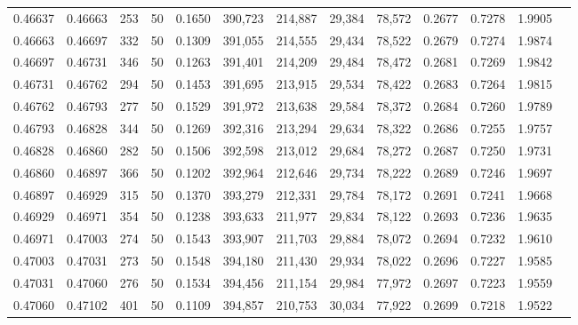 \begin{tabular}{rrrrrrrrrrrrr}
0.46637 & 0.46663 &   253 &  50 &                                     0.1650 & 390,723 & 214,887 &  29,384 &  78,572 & 0.2677 & 0.7278 & 1.9905 \\
0.46663 & 0.46697 &   332 &  50 &                                     0.1309 & 391,055 & 214,555 &  29,434 &  78,522 & 0.2679 & 0.7274 & 1.9874 \\
0.46697 & 0.46731 &   346 &  50 &                                     0.1263 & 391,401 & 214,209 &  29,484 &  78,472 & 0.2681 & 0.7269 & 1.9842 \\
0.46731 & 0.46762 &   294 &  50 &                                     0.1453 & 391,695 & 213,915 &  29,534 &  78,422 & 0.2683 & 0.7264 & 1.9815 \\
0.46762 & 0.46793 &   277 &  50 &                                     0.1529 & 391,972 & 213,638 &  29,584 &  78,372 & 0.2684 & 0.7260 & 1.9789 \\
0.46793 & 0.46828 &   344 &  50 &                                     0.1269 & 392,316 & 213,294 &  29,634 &  78,322 & 0.2686 & 0.7255 & 1.9757 \\
0.46828 & 0.46860 &   282 &  50 &                                     0.1506 & 392,598 & 213,012 &  29,684 &  78,272 & 0.2687 & 0.7250 & 1.9731 \\
0.46860 & 0.46897 &   366 &  50 &                                     0.1202 & 392,964 & 212,646 &  29,734 &  78,222 & 0.2689 & 0.7246 & 1.9697 \\
0.46897 & 0.46929 &   315 &  50 &                                     0.1370 & 393,279 & 212,331 &  29,784 &  78,172 & 0.2691 & 0.7241 & 1.9668 \\
0.46929 & 0.46971 &   354 &  50 &                                     0.1238 & 393,633 & 211,977 &  29,834 &  78,122 & 0.2693 & 0.7236 & 1.9635 \\
0.46971 & 0.47003 &   274 &  50 &                                     0.1543 & 393,907 & 211,703 &  29,884 &  78,072 & 0.2694 & 0.7232 & 1.9610 \\
0.47003 & 0.47031 &   273 &  50 &                                     0.1548 & 394,180 & 211,430 &  29,934 &  78,022 & 0.2696 & 0.7227 & 1.9585 \\
0.47031 & 0.47060 &   276 &  50 &                                     0.1534 & 394,456 & 211,154 &  29,984 &  77,972 & 0.2697 & 0.7223 & 1.9559 \\
0.47060 & 0.47102 &   401 &  50 &                                     0.1109 & 394,857 & 210,753 &  30,034 &  77,922 & 0.2699 & 0.7218 & 1.9522 \\

\end{tabular}
